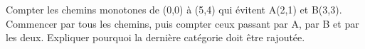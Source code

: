 \documentclass[11pt]{article}
\begin{document}
Compter les chemins monotones de (0,0) à (5,4) qui évitent A(2,1) et B(3,3). Commencer par tous les chemins, puis compter ceux passant par A, par B et par les deux. Expliquer pourquoi la dernière catégorie doit être rajoutée.\par
\vspace{5pt}
\end{document}
